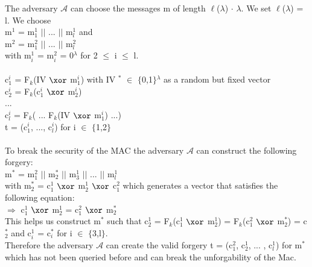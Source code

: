 \begin{itemize}
The adversary \(\mathcal{A}\) can choose the messages m of length \(\ell\)(\(\lambda\)) \(\cdot\) \(\lambda\). We set \(\ell\)(\(\lambda\)) = l. We choose \\
m\(^{1}\) = m\(_{1}^{1}\) \(\vert \vert\) ...  \(\vert \vert\)  m\(_{l}^{1}\) and\\ 
m\(^{2}\) = m\(_{1}^{2}\) \(\vert \vert\) ...  \(\vert \vert\)  m\(_{l}^{2}\) \\ with m\(_{i}^{1}\) = m\(_{i}^{2}\) =  0\(^{\lambda}\) for 2 \(\leq\) i \(\leq\) l.\\
\\
c\(_{1}^{i}\) = F\(_{k}\)(IV \(\xor\) m\(_{1}^{i}\)) with IV \(^{*}\) \(\in\) \(\{\)0,1\(\}\)\(^{\lambda}\) as a random but fixed vector \\
c\(_{2}^{i}\) = F\(_{k}\)(c\(_{1}^{i}\) \(\xor\) m\(_{2}^{i}\))\\
... \\
c\(_{l}^{i}\) = F\(_{k}\)( ... F\(_{k}\)(IV \(\xor\) m\(_{1}^{i}\)) ...) \\
t = (c\(_{1}^{i}\), ..., c\(_{l}^{i}\)) for i \(\in\) \(\{\)1,2\(\}\) \\
\\
To break the security of the MAC the adversary \(\mathcal{A}\) can construct the following forgery: \\
m\(^{*}\) =  m\(_{1}^{2}\) \(\vert \vert\) m\(_{2}^{*}\) \(\vert \vert\) m\(_{3}^{1}\) \(\vert \vert\) ...  \(\vert \vert\) m\(_{l}^{1}\) \\
with m\(_{2}^{*}\) = c\(_{1}^{1}\) \(\xor\) m\(_{2}^{1}\) \(\xor\) c\(_{1}^{2}\) which generates a vector that satisfies the following equation:\\
\(\Rightarrow\) c\(_{1}^{1}\) \(\xor\) m\(_{2}^{1}\) = c\(_{1}^{2}\) \(\xor\) m\(_{2}^{*}\)  \\
This helps us construct m\(^{*}\) such that c\(_{2}^{1}\) = F\(_{k}\)(c\(_{1}^{1}\) \(\xor\) m\(_{2}^{1}\)) = F\(_{k}\)(c\(_{1}^{2}\) \(\xor\) m\(_{2}^{*}\)) = c\(_{2}^{*}\) and c\(_{i}^{1}\) = c\(_{i}^{*}\) for i \(\in\) \(\{\)3,l\(\}\).\\
Therefore the adversary \(\mathcal{A}\) can create the valid forgery t = (c\(_{1}^{2}\), c\(_{2}^{1}\), ... , c\(_{l}^{1}\)) for m\(^{*}\) which has not been queried before and can break the unforgability of the Mac.

\end{itemize}
